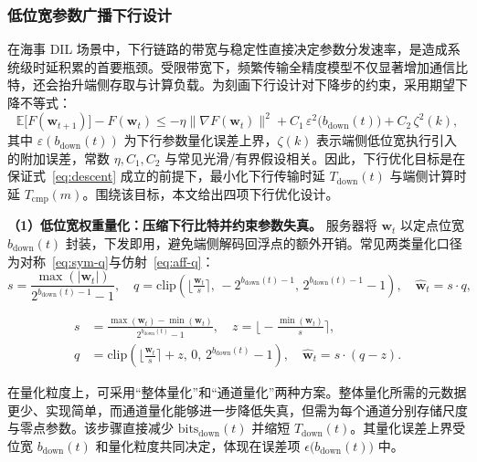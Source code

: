 \subsubsection{低位宽参数广播下行设计}\label{sec:low_bit_down}
在海事 DIL 场景中，下行链路的带宽与稳定性直接决定参数分发速率，是造成系统级时延积累的首要瓶颈。受限带宽下，频繁传输全精度模型不仅显著增加通信比特，还会抬升端侧存取与计算负载。为刻画下行设计对下降步的约束，采用期望下降不等式：
\begin{equation}
	\label{eq:descent}
	\mathbb{E}\big[F(\mathbf{w}_{t+1})\big] - F(\mathbf{w}_t)
	\le
	- \eta \big\|\nabla F(\mathbf{w}_t)\big\|^{2}
	+ C_1\,\varepsilon^{2}\!\big(b_{\text{down}}(t)\big)
	+ C_2\,\zeta^{2}(k),
\end{equation}
其中 $\varepsilon(b_{\text{down}}(t))$ 为下行参数量化误差上界，$\zeta(k)$ 表示端侧低位宽执行引入的附加误差，常数 $\eta, C_1, C_2$ 与常见光滑/有界假设相关。因此，下行优化目标是在保证式~\eqref{eq:descent} 成立的前提下，最小化下行传输时延 $T_{\text{down}}(t)$ 与端侧计算时延 $T_{\mathrm{cmp}}(m)$。围绕该目标，本文给出四项下行优化设计。

\textbf{（1）低位宽权重量化：压缩下行比特并约束参数失真。}
服务器将 $\textbf{w}_t$ 以定点位宽 $b_{\text{down}}(t)$ 封装，下发即用，避免端侧解码回浮点的额外开销。常见两类量化口径为对称~\eqref{eq:sym-q}与仿射~\eqref{eq:aff-q}：
\begin{equation}\label{eq:sym-q}
	s = \frac{\max(|\mathbf{w}_t|)}{2^{b_{\text{down}}(t)-1}-1},\quad
	q = \mathrm{clip}\!\left(
	\Big\lfloor \tfrac{\mathbf{w}_t}{s}\Big\rceil,\,
	-2^{b_{\text{down}}(t)-1},\,
	2^{b_{\text{down}}(t)-1}-1
	\right),\quad
	\hat{\mathbf{w}}_t = s \cdot q ,
\end{equation}

\begin{equation}\label{eq:aff-q}
	\begin{aligned}
		s &= \frac{\max(\mathbf{w}_t)-\min(\mathbf{w}_t)}{2^{b_{\text{down}}(t)}-1},\quad
		z = \Big\lfloor -\tfrac{\min(\mathbf{w}_t)}{s}\Big\rceil, \\
		q &= \mathrm{clip}\!\left(
		\Big\lfloor \tfrac{\mathbf{w}_t}{s}\Big\rceil + z,\,
		0,\,
		2^{b_{\text{down}}(t)}-1
		\right),\quad
		\hat{\mathbf{w}}_t = s \cdot (q - z).
	\end{aligned}
\end{equation}

在量化粒度上，可采用“整体量化”和“通道量化”两种方案。整体量化所需的元数据更少、实现简单，而通道量化能够进一步降低失真，但需为每个通道分别存储尺度与零点参数。该步骤直接减少 $\mathrm{bits}_{\text{down}}(t)$ 并缩短 $T_{\text{down}}(t)$。其量化误差上界受位宽 $b_{\text{down}}(t)$ 和量化粒度共同决定，体现在误差项 $\epsilon\!\big(b_{\text{down}}(t)\big)$ 中。

